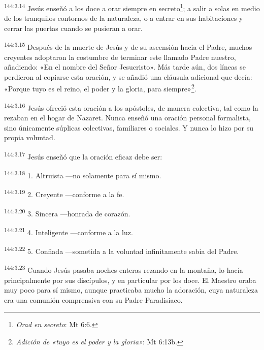 \par
\textsuperscript{144:3.14} Jesús enseñó a los doce a orar siempre en secreto\footnote{\textit{Orad en secreto}: Mt 6:6.}; a salir a solas en medio de los tranquilos contornos de la naturaleza, o a entrar en sus habitaciones y cerrar las puertas cuando se pusieran a orar.

\par
\textsuperscript{144:3.15} Después de la muerte de Jesús y de su ascensión hacia el Padre, muchos creyentes adoptaron la costumbre de terminar este llamado Padre nuestro, añadiendo: «En el nombre del Señor Jesucristo». Más tarde aún, dos líneas se perdieron al copiarse esta oración, y se añadió una cláusula adicional que decía: «Porque tuyo es el reino, el poder y la gloria, para siempre»\footnote{\textit{Adición de «tuyo es el poder y la gloria»}: Mt 6:13b.}.

\par
\textsuperscript{144:3.16} Jesús ofreció esta oración a los apóstoles, de manera colectiva, tal como la rezaban en el hogar de Nazaret. Nunca enseñó una oración personal formalista, sino únicamente súplicas colectivas, familiares o sociales. Y nunca lo hizo por su propia voluntad.

\par
\textsuperscript{144:3.17} Jesús enseñó que la oración eficaz debe ser:

\par
\textsuperscript{144:3.18} 1. Altruista ---no solamente para sí mismo.

\par
\textsuperscript{144:3.19} 2. Creyente ---conforme a la fe.

\par
\textsuperscript{144:3.20} 3. Sincera ---honrada de corazón.

\par
\textsuperscript{144:3.21} 4. Inteligente ---conforme a la luz.

\par
\textsuperscript{144:3.22} 5. Confiada ---sometida a la voluntad infinitamente sabia del Padre.

\par
\textsuperscript{144:3.23} Cuando Jesús pasaba noches enteras rezando en la montaña, lo hacía principalmente por sus discípulos, y en particular por los doce. El Maestro oraba muy poco para sí mismo, aunque practicaba mucho la adoración, cuya naturaleza era una comunión comprensiva con su Padre Paradisiaco.

